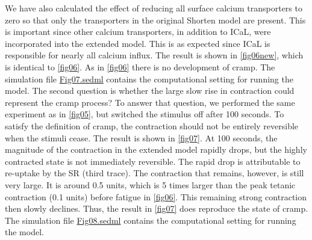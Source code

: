 \documentclass[fleqn,10pt]{physiome}
\begin{document}
We have also calculated the effect of reducing all surface calcium transporters to zero so that only the transporters in the original Shorten model are present. This is important since other calcium transporters, in addition to ICaL, were incorporated into the extended model. This is as expected since ICaL is responsible for nearly all calcium influx. The result is shown in \autoref{fig06new}, which is identical to \autoref{fig06}. As in \autoref{fig06} there is no development of cramp. The simulation file \href{http://models.cellml.org/workspace/5f4/file/4071d5b4ec40c5e2b845a7a75e942df1966d2ba2/Fig07.sedml}{Fig07.sedml} contains the computational setting for running the model. The second question is whether the large slow rise in contraction could represent the cramp process? To answer that question, we performed the same experiment as in \autoref{fig05}, but switched the stimulus off after 100 seconds. To satisfy the definition of cramp, the contraction should not be entirely reversible when the stimuli cease. The result is shown in \autoref{fig07}. At 100 seconds, the magnitude of the contraction in the extended model rapidly drops, but the highly contracted state is not immediately reversible. The rapid drop is attributable to re-uptake by the SR (third trace). The contraction that remains, however, is still very large. It is around 0.5 units, which is 5 times larger than the peak tetanic contraction (0.1 units) before fatigue in \autoref{fig06}. This remaining strong contraction then slowly declines. Thus, the result in \autoref{fig07} does reproduce the state of cramp. The simulation file \href{http://models.cellml.org/workspace/5f4/file/4071d5b4ec40c5e2b845a7a75e942df1966d2ba2/Fig08.sedml}{Fig08.sedml} contains the computational setting for running the model.
\end{document}
